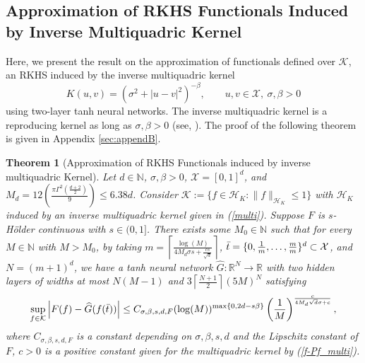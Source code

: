 \documentclass{article}
\def\NN{\mathbb N}
\def\RR{\mathbb R}
\numberwithin{equation}{section}
\newtheorem{theorem}{Theorem}[section]
\begin{document}
\subsection{Approximation of RKHS Functionals Induced by Inverse Multiquadric Kernel }
Here, we present the result on the approximation of functionals defined over $\mathcal{K}$, an RKHS induced by the inverse multiquadric kernel 
\begin{equation}\label{multi}
    K(u,v) = (\sigma^2 + |u-v|^2)^{-\beta}, \qquad  u,v \in \mathcal{X}, \ \sigma, \beta >0
\end{equation} using two-layer tanh neural networks. 
The inverse multiquadric kernel is a reproducing kernel as long as $\sigma,\beta >0$ (see, \citep{bozzini2015radial, tolstikhin2017minimax}). 
The proof of the following theorem is given in Appendix \ref{sec:appendB}. 

\begin{theorem}[Approximation of RKHS Functionals induced by inverse multiquadric Kernel]\label{thm:multi}
Let $d\in \NN$, $\sigma, \beta >0$, $\mathcal{X} = [0,1]^d$, and $M_d = 12 \left(\frac{\pi \Gamma^2(\frac{d+2}{2})}{9}\right) \leq 6.38d$. 
Consider $
    \mathcal{K} := \{f\in \mathcal{H}_K: \|f\|_{\mathcal{H}_K} \leq 1\}
$ with $\mathcal{H}_K$ induced by an inverse multiquadric kernel given in (\ref{multi}). 
Suppose $F$ is  $s$-H\"{o}lder continuous with $s \in (0,1]$. 
There exists some $M_0\in \NN$ such that for every $M\in \NN$ with $M>M_0$, by taking $m=\left\lceil\frac{\log (M)}{4M_d\sigma s + \frac{cs}{\sqrt{d}}}\right\rceil$, $\Bar{t}=\{0, \frac{1}{m},\ldots, \frac{m}{m}\}^d \subset \mathcal{X}$, and $N= (m+1)^d$, we have a tanh neural network $\widehat{G}: \RR^N \to \RR$ with two hidden layers of widths at most $N(M-1)$ and $3\left\lceil\frac{N+1}{2}\right\rceil (5M)^N$ satisfying 
\begin{equation*}
    \sup_{f\in \mathcal{K}}\left|F(f) - \widehat{G}(f(\Bar{t}))\right|\leq C_{\sigma, \beta, s, d, F} (\log (M))^{\max\{0, 2d-s\beta\}}\left(\frac{1}{M}\right)^{\frac{c}{4M_d \sqrt{d}\sigma+c}},
\end{equation*}
where $C_{\sigma, \beta, s, d, F}$ is a constant depending on $\sigma, \beta, s, d$ and the Lipschitz constant of $F$, $c>0$ is a positive constant given for the multiquadric kernel by (\ref{f-Pf_multi}). 
\end{theorem}
\end{document}
